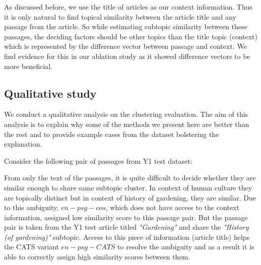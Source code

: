As discussed before, we use the title of articles as our context information. Thus it is only natural to find topical similarity between the article title and any passage from the article. So while estimating subtopic similarity between these passages, the deciding factors should be other topics than the title topic (context) which is represented by the difference vector between passage and context. We find evidence for this in our ablation study as it showed difference vectors to be more beneficial. 

\subsection{Qualitative study} We conduct a qualitative analysis on the clustering evaluation. The aim of this analysis is to explain why some of the methods we present here are better than the rest and to provide example cases from the dataset bolstering the explanation.

Consider the following pair of passages from Y1 test dataset:

\noindent{}

From only the text of the passages, it is quite difficult to decide whether they are similar enough to share same subtopic cluster. In context of human culture they are topically distinct but in context of history of gardening, they are similar. Due to this ambiguity, $en-psg-cos$, which does not have access to the context information, assigned low similarity score to this passage pair. But the passage pair is taken from the Y1 test article titled \textit{"Gardening"} and share the \textit{"History (of gardening)"} subtopic. Access to this piece of information (article title) helps the CATS variant $en-psg-CATS$ to resolve the ambiguity and as a result it is able to correctly assign high similarity scores between them.

